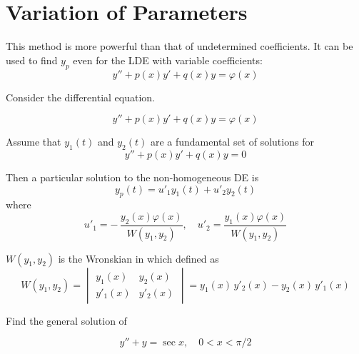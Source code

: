 \section{Variation of Parameters}

This method is more powerful than that of undetermined coefficients. It can be used to find 
$y_p$ even for the LDE with variable coefficients:
\begin{equation}
    y'' + p(x)y' + q(x)y = \varphi(x)
\end{equation}

\begin{theorem}
    Consider the differential equation. 

    \begin{equation}
        y'' + p(x)y' + q(x)y = \varphi(x)
    \end{equation}

    Assume that $y_1(t)$ and $y_2(t)$ are a fundamental set of solutions for 
    \begin{equation}
        y'' + p(x)y' + q(x)y = 0
    \end{equation}

    Then a particular solution to the non-homogeneous DE is
    \begin{equation}
        y_p(t) = u'_1 y_1(t) + u'_2 y_2(t)
    \end{equation}
    where 
    \begin{equation}
        u'_1 = -\,\frac{y_2(x) \varphi(x)}{W(y_1, y_2)}, \quad
        u'_2 = \frac{y_1(x) \varphi(x)}{W(y_1, y_2)} 
    \end{equation}

    $W(y_1, y_2)$ is the Wronskian in which defined as 
    \begin{equation}
        W(y_1, y_2) = \begin{vmatrix}
            y_1(x) & y_2(x)\\
            y'_1(x) & y'_2(x)
        \end{vmatrix} = y_1(x)\,y'_2(x) - y_2(x)\,y'_1(x)
    \end{equation}
\end{theorem}

\begin{example}
    Find the general solution of 

    \[
        y'' + y = \sec x, \quad 0 < x < \pi/2
    \]
\end{example}

